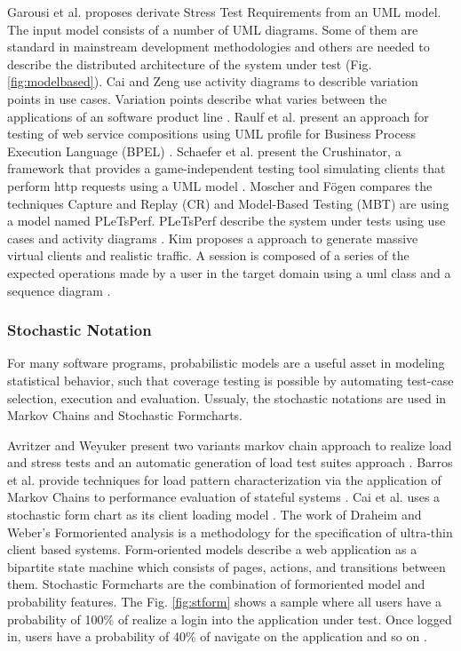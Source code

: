 \documentclass[espaco=umemeio,chapter=TITLE,twoside,openright]{abnt}
\begin{document}
Garousi et al. proposes derivate Stress Test Requirements from an UML model. The input model consists of a number of UML diagrams. Some of
them are standard in mainstream development methodologies and others are needed to describe the distributed architecture of the system under test (Fig. \ref{fig:modelbased}). Cai and Zeng use activity diagrams to describle variation points in use cases. Variation points describe what varies between the applications of an software product line \cite{XinyingCai2007}. Raulf et al. present an approach for testing of web service compositions using UML profile for Business Process Execution Language (BPEL) \cite{Rauf2009}. Schaefer et al. present the Crushinator, a framework that provides a game-independent testing tool simulating clients that perform http requests using a UML model \cite{Schaefer2013}. Moscher and  Fögen compares the techniques Capture and Replay (CR) and Model-Based Testing (MBT) are using a model named PLeTsPerf. PLeTsPerf describe the system under tests using use cases and activity diagrams \cite{moscher2017facing}. Kim proposes a approach to generate massive virtual clients and realistic traffic. A session is composed of a series of the expected operations made by a user in the target domain using a uml class and a sequence diagram \cite{Kim2005}.



\subsubsection{Stochastic Notation}


For many software programs, probabilistic models are a useful asset in
modeling statistical behavior, such that coverage testing is possible by automating
test-case selection, execution and evaluation. Ussualy, the stochastic notations are used in Markov Chains and Stochastic Formcharts. 

Avritzer and Weyuker present two variants markov chain approach to realize load and stress tests and an automatic generation of load test suites approach \cite{Avritzer1993} \cite{Avritzer1995b}. Barros et al. provide techniques for load pattern characterization via the application of Markov Chains to performance evaluation of stateful systems \cite{Barros2007}. Cai et al. uses a stochastic form chart as its client loading model \cite{Cai2007}. The work of Draheim and Weber’s Formoriented analysis is a methodology for the specification of ultra-thin client based systems. Form-oriented models describe a web application as a bipartite state machine which consists of pages, actions, and transitions between them. Stochastic Formcharts are the combination of formoriented model and probability features. The Fig. \ref{fig:stform} shows a sample where all users have a probability of 100\% of realize a login into the application under test. Once logged in, users have a probability of 40\% of navigate on the application and so on \cite{Draheim2006b} \cite{Marinescu2015}.
\end{document}
